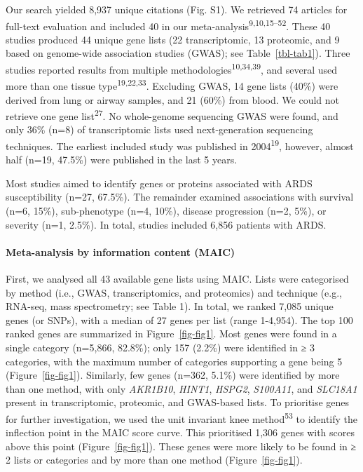 \documentclass[
  11,
  a4paper,
]{article}
\let\oldparagraph\paragraph
\renewcommand{\paragraph}[1]{\oldparagraph{#1}\mbox{}}
\begin{document}
Our search yielded 8,937 unique citations (Fig. S1). We retrieved 74
articles for full-text evaluation and included 40 in our
meta-analysis\textsuperscript{9,10,15--52}. These 40 studies produced 44
unique gene lists (22 transcriptomic, 13 proteomic, and 9 based on
genome-wide association studies (GWAS); see Table~\ref{tbl-tab1}). Three
studies reported results from multiple
methodologies\textsuperscript{10,34,39}, and several used more than one
tissue type\textsuperscript{19,22,33}. Excluding GWAS, 14 gene lists
(40\%) were derived from lung or airway samples, and 21 (60\%) from
blood. We could not retrieve one gene list\textsuperscript{27}. No
whole-genome sequencing GWAS were found, and only 36\% (n=8) of
transcriptomic lists used next-generation sequencing techniques. The
earliest included study was published in 2004\textsuperscript{19},
however, almost half (n=19, 47.5\%) were published in the last 5 years.

Most studies aimed to identify genes or proteins associated with ARDS
susceptibility (n=27, 67.5\%). The remainder examined associations with
survival (n=6, 15\%), sub-phenotype (n=4, 10\%), disease progression
(n=2, 5\%), or severity (n=1, 2.5\%). In total, studies included 6,856
patients with ARDS.

\hypertarget{meta-analysis-by-information-content-maic}{%
\paragraph{Meta-analysis by information content
(MAIC)}\label{meta-analysis-by-information-content-maic}}

First, we analysed all 43 available gene lists using MAIC. Lists were
categorised by method (i.e., GWAS, transcriptomics, and proteomics) and
technique (e.g., RNA-seq, mass spectrometry; see Table 1). In total, we
ranked 7,085 unique genes (or SNPs), with a median of 27 genes per list
(range 1-4,954). The top 100 ranked genes are summarized in
Figure~\ref{fig-fig1}. Most genes were found in a single category
(n=5,866, 82.8\%); only 157 (2.2\%) were identified in ≥ 3 categories,
with the maximum number of categories supporting a gene being 5
(Figure~\ref{fig-fig1}). Similarly, few genes (n=362, 5.1\%) were
identified by more than one method, with only \emph{AKR1B10},
\emph{HINT1}, \emph{HSPG2}, \emph{S100A11}, and \emph{SLC18A1} present
in transcriptomic, proteomic, and GWAS-based lists. To prioritise genes
for further investigation, we used the unit invariant knee
method\textsuperscript{53} to identify the inflection point in the MAIC
score curve. This prioritised 1,306 genes with scores above this point
(Figure~\ref{fig-fig1}). These genes were more likely to be found in ≥ 2
lists or categories and by more than one method (Figure~\ref{fig-fig1}).
\end{document}
